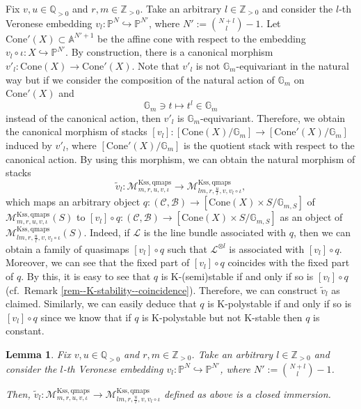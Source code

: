 \documentclass[12pt,twoside]{amsart}
\newtheorem{lem}[thm]{Lemma}
\theoremstyle{definition}
\begin{document}
Fix $v,u\in\mathbb{Q}_{>0}$ and $r,m\in\mathbb{Z}_{>0}$.
Take an arbitrary $l\in\mathbb{Z}_{>0}$ and consider the $l$-th Veronese embedding $v_l\colon \mathbb{P}^N\hookrightarrow\mathbb{P}^{N'}$, where $N':=\binom{N+l}{l}-1$. 
Let $\mathrm{Cone}'(X)\subset\mathbb{A}^{N'+1}$ be the affine cone with respect to the embedding $v_l\circ\iota\colon X\hookrightarrow \mathbb{P}^{N'}$.
By construction, there is a canonical morphism $v'_l\colon\mathrm{Cone}(X)\to \mathrm{Cone}'(X)$.
    Note that $v'_l$ is not $\mathbb{G}_m$-equivariant in the natural way but if we consider the composition of the natural action of $\mathbb{G}_{m}$ on $\mathrm{Cone}'(X)$ and 
    \[
    \mathbb{G}_{m}\ni t\mapsto t^l\in\mathbb{G}_m
    \]
   instead of the canonical action, then $v'_l$ is $\mathbb{G}_m$-equivariant. 
Therefore, we obtain the canonical morphism of stacks $[v_l]\colon[\mathrm{Cone}(X)/\mathbb{G}_m]\to [\mathrm{Cone}'(X)/\mathbb{G}_m]$ induced by $v'_l$, where $[\mathrm{Cone}'(X)/\mathbb{G}_m]$ is the quotient stack with respect to the canonical action.
By using this morphism, we can obtain the natural morphism of stacks
\[
\tilde{v}_l\colon\mathcal{M}^{\mathrm{Kss,qmaps}}_{m,r,u,v,\iota}\to\mathcal{M}^{\mathrm{Kss,qmaps}}_{lm,r,\frac{u}{l},v,v_l\circ\iota},
\]
which maps an arbitrary object $q\colon (\mathcal{C},\mathcal{B})\to [\mathrm{Cone}(X)\times S/\mathbb{G}_{m,S}]$ of $\mathcal{M}^{\mathrm{Kss,qmaps}}_{m,r,u,v,\iota}(S)$ to $[v_l]\circ q\colon (\mathcal{C},\mathcal{B})\to [\mathrm{Cone}(X)\times S/\mathbb{G}_{m,S}]$ as an object of $\mathcal{M}^{\mathrm{Kss,qmaps}}_{lm,r,\frac{u}{l},v,v_l\circ\iota}(S)$.
Indeed, if $\mathscr{L}$ is the line bundle associated with $q$, then we can obtain a family of quasimaps $[v_l]\circ q$ such that $\mathscr{L}^{\otimes l}$ is associated with $[v_l]\circ q$. 
Moreover, we can see that the fixed part of $[v_l]\circ q$ coincides with the fixed part of $q$.
By this, it is easy to see that $q$ is K-(semi)stable if and only if so is $[v_l]\circ q$ (cf.~Remark \ref{rem--K-stability--coincidence}).
Therefore, we can construct $\tilde{v}_l$ as claimed.
Similarly, we can easily deduce that $q$ is K-polystable if and only if so is $[v_l]\circ q$ since we know that if $q$ is K-polystable but not K-stable then $q$ is constant.



\begin{lem}\label{lem--stack--closed--immersion}
Fix 
$v,u\in\mathbb{Q}_{>0}$ and $r,m\in\mathbb{Z}_{>0}$.
Take an arbitrary $l\in\mathbb{Z}_{>0}$ and consider the $l$-th Veronese embedding $v_l\colon \mathbb{P}^N\hookrightarrow\mathbb{P}^{N'}$, where $N':=\binom{N+l}{l}-1$.

Then, $\tilde{v}_l\colon\mathcal{M}^{\mathrm{Kss,qmaps}}_{m,r,u,v,\iota}\to\mathcal{M}^{\mathrm{Kss,qmaps}}_{lm,r,\frac{u}{l},v,v_l\circ\iota}$ defined as above is a closed immersion.
\end{lem}
\end{document}
